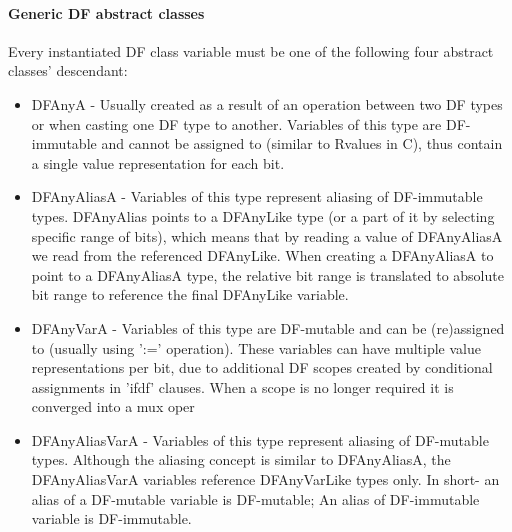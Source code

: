 \paragraph{Generic DF abstract classes}Every instantiated DF class variable must be one of the following four abstract classes' descendant: 
\begin{itemize}
	\item DFAnyA - Usually created as a result of an operation between two DF types or when casting  one DF type to another. Variables of this type are DF-immutable and cannot be assigned to (similar to Rvalues in C), thus contain a single value representation for each bit.
	\item DFAnyAliasA - Variables of this type represent aliasing of DF-immutable types. DFAnyAlias points to a DFAnyLike type (or a part of it by selecting specific range of bits), which means that by reading a value of DFAnyAliasA we read from the referenced DFAnyLike. When creating a DFAnyAliasA to point to a DFAnyAliasA type, the relative bit range is translated to absolute bit range to reference the final DFAnyLike variable.
	\item DFAnyVarA - Variables of this type are DF-mutable and can be (re)assigned to (usually using ':=' operation). These variables can have multiple value representations per bit, due to additional DF scopes created by conditional assignments in 'ifdf' clauses. When a scope is no longer required it is converged into a mux oper
	\item DFAnyAliasVarA - Variables of this type represent aliasing of DF-mutable types. Although the aliasing concept is similar to DFAnyAliasA, the DFAnyAliasVarA variables reference DFAnyVarLike types only. In short- an alias of a DF-mutable variable is DF-mutable; An alias of DF-immutable variable is DF-immutable.
\end{itemize}

%


